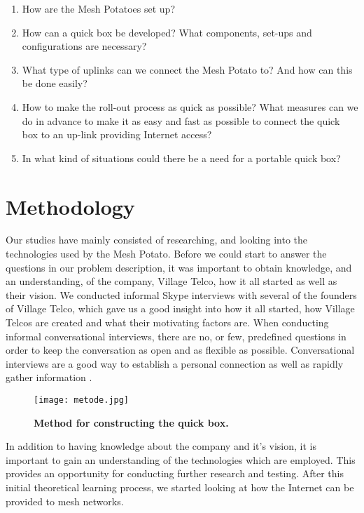 \begin{enumerate}
\item How are the Mesh Potatoes set up? 
\item How can a \gls{quick} box be developed? What components, set-ups and configurations are necessary?
\item What type of uplinks can we connect the Mesh Potato to? And how can this be done easily? 
\item How to make the roll-out process as quick as possible? What measures can we do in advance to make it as easy and fast as possible to connect the \gls{quick} box to an up-link providing Internet access?
\item In what kind of situations could there be a need for a portable \gls{quick} box?
\end{enumerate}


\section{Methodology}

Our studies have mainly consisted of researching, and looking into the technologies used by the Mesh Potato. Before we could start to answer the questions in our problem description, it was important to obtain knowledge, and an understanding, of the company, Village Telco, how it all started as well as their vision. We conducted informal Skype interviews with several of the founders of Village Telco, which gave us a good insight into how it all started, how Village Telcos are created and what their motivating factors are. When conducting informal conversational interviews, there are no, or few, predefined questions in order to keep the conversation as open and as flexible as possible. Conversational interviews are a good way to establish a personal connection as well as rapidly gather information \cite{interview}. 

\begin{figure}[b]
  \centering
      \texttt{[image: metode.jpg]}
  \caption [Method for constructing the \gls{quick} box.]{\textbf{Method for constructing the \gls{quick} box.}}
  \label{fig:metode}
\end{figure}


In addition to having knowledge about the company and it's vision, it is important to gain an understanding of the technologies which are employed. This provides an opportunity for conducting further research and testing. After this initial theoretical learning process, we started looking at how the Internet can be provided to mesh networks. 

